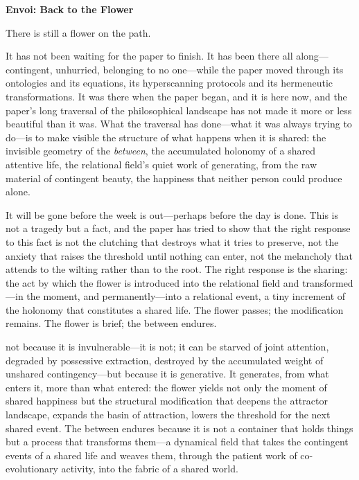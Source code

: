\newpage
\goldrule
\begin{center}
{\large\bfseries\color{rosedeep} Envoi: Back to the Flower}
\end{center}
\goldrule

\vspace{0.8em}

\noindent
There is still a flower on the path.

\vspace{0.6em}

\noindent
It has not been waiting for the paper to finish. It has been there all along---contingent, unhurried, belonging to no one---while the paper moved through its ontologies and its equations, its hyperscanning protocols and its hermeneutic transformations. It was there when the paper began, and it is here now, and the paper's long traversal of the philosophical landscape has not made it more or less beautiful than it was. What the traversal has done---what it was always trying to do---is to make visible the structure of what happens when it is shared: the invisible geometry of the \emph{between}, the accumulated holonomy of a shared attentive life, the relational field's quiet work of generating, from the raw material of contingent beauty, the happiness that neither person could produce alone.

\vspace{0.6em}

\noindent
{} It will be gone before the week is out---perhaps before the day is done. This is not a tragedy but a fact, and the paper has tried to show that the right response to this fact is not the clutching that destroys what it tries to preserve, not the anxiety that raises the threshold until nothing can enter, not the melancholy that attends to the wilting rather than to the root. The right response is the sharing: the act by which the flower is introduced into the relational field and transformed---in the moment, and permanently---into a relational event, a tiny increment of the holonomy that constitutes a shared life. The flower passes; the modification remains. The flower is brief; the between endures.

\vspace{0.6em}

\noindent
{} not because it is invulnerable---it is not; it can be starved of joint attention, degraded by possessive extraction, destroyed by the accumulated weight of unshared contingency---but because it is generative. It generates, from what enters it, more than what entered: the flower yields not only the moment of shared happiness but the structural modification that deepens the attractor landscape, expands the basin of attraction, lowers the threshold for the next shared event. The between endures because it is not a container that holds things but a process that transforms them---a dynamical field that takes the contingent events of a shared life and weaves them, through the patient work of co-evolutionary activity, into the fabric of a shared world.

